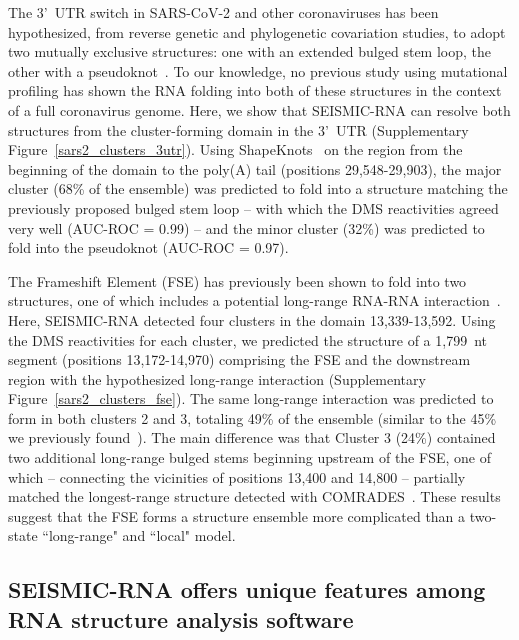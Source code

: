 \documentclass[unnumsec,webpdf,contemporary,large]{oup-authoring-template}%
\theoremstyle{thmstyleone}%
\theoremstyle{thmstyletwo}%
\theoremstyle{thmstylethree}%
\begin{document}
The 3'~UTR switch in SARS-CoV-2 and other coronaviruses has been hypothesized, from reverse genetic and phylogenetic covariation studies, to adopt two mutually exclusive structures: one with an extended bulged stem loop, the other with a pseudoknot~\cite{Yang2015a}.
To our knowledge, no previous study using mutational profiling has shown the RNA folding into both of these structures in the context of a full coronavirus genome.
Here, we show that SEISMIC-RNA can resolve both structures from the cluster-forming domain in the 3'~UTR (Supplementary Figure~\ref{sars2_clusters_3utr}).
Using ShapeKnots~\cite{Hajdin2013} on the region from the beginning of the domain to the poly(A) tail (positions 29,548-29,903), the major cluster (68\% of the ensemble) was predicted to fold into a structure matching the previously proposed bulged stem loop -- with which the DMS reactivities agreed very well (AUC-ROC = 0.99) -- and the minor cluster (32\%) was predicted to fold into the pseudoknot (AUC-ROC = 0.97).

The Frameshift Element (FSE) has previously been shown to fold into two structures, one of which includes a potential long-range RNA-RNA interaction~\cite{Lan2022, Ziv2020}.
Here, SEISMIC-RNA detected four clusters in the domain 13,339-13,592.
Using the DMS reactivities for each cluster, we predicted the structure of a 1,799~nt segment (positions 13,172-14,970) comprising the FSE and the downstream region with the hypothesized long-range interaction (Supplementary Figure~\ref{sars2_clusters_fse}).
The same long-range interaction was predicted to form in both clusters 2 and 3, totaling 49\% of the ensemble (similar to the 45\% we previously found~\cite{Lan2022}).
The main difference was that Cluster 3 (24\%) contained two additional long-range bulged stems beginning upstream of the FSE, one of which -- connecting the vicinities of positions 13,400 and 14,800 -- partially matched the longest-range structure detected with COMRADES~\cite{Ziv2020}.
These results suggest that the FSE forms a structure ensemble more complicated than a two-state ``long-range" and ``local" model.


\subsection{SEISMIC-RNA offers unique features among RNA structure analysis software}
\end{document}
